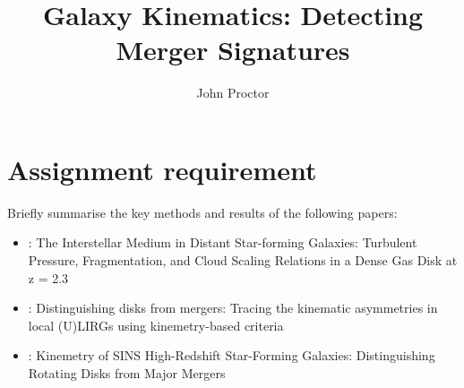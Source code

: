 \documentclass[ceqn,usenatbib,onecolumn]{mnras}
\title{Galaxy Kinematics: Detecting Merger Signatures}
\author{John Proctor}
\begin{document}
\maketitle

\section{Assignment requirement}

Briefly summarise the key methods and results of the following papers:

\begin{itemize}
    \item \citet{2011ApJ...742...11S} : {The Interstellar Medium in Distant Star-forming Galaxies: Turbulent Pressure, Fragmentation, and Cloud Scaling Relations in a Dense Gas Disk at z = 2.3}
    \item \citet{2016A&A...591A..85B} : {Distinguishing disks from mergers: Tracing the kinematic asymmetries in local (U)LIRGs using kinemetry-based criteria}
    \item \citet{2008ApJ...682..231S} : {Kinemetry of SINS High-Redshift Star-Forming Galaxies: Distinguishing Rotating Disks from Major Mergers}
\end{itemize}
\end{document}
